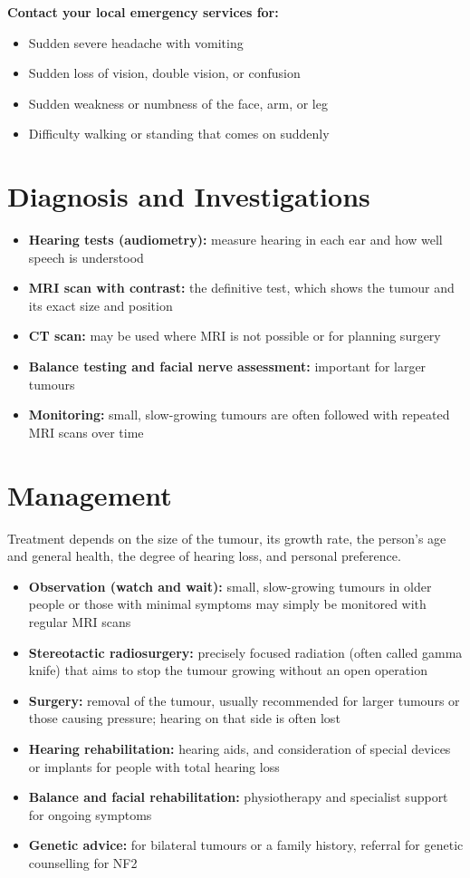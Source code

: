 \textbf{Contact your local emergency services for:}
\begin{itemize}
    \item Sudden severe headache with vomiting
    \item Sudden loss of vision, double vision, or confusion
    \item Sudden weakness or numbness of the face, arm, or leg
    \item Difficulty walking or standing that comes on suddenly
\end{itemize}

\section*{Diagnosis and Investigations}
\begin{itemize}
    \item \textbf{Hearing tests (audiometry):} measure hearing in each ear and how well speech is understood
    \item \textbf{MRI scan with contrast:} the definitive test, which shows the tumour and its exact size and position
    \item \textbf{CT scan:} may be used where MRI is not possible or for planning surgery
    \item \textbf{Balance testing and facial nerve assessment:} important for larger tumours
    \item \textbf{Monitoring:} small, slow-growing tumours are often followed with repeated MRI scans over time
\end{itemize}

\section*{Management}
Treatment depends on the size of the tumour, its growth rate, the person's age and general health, the degree of hearing loss, and personal preference.

\begin{itemize}
    \item \textbf{Observation (watch and wait):} small, slow-growing tumours in older people or those with minimal symptoms may simply be monitored with regular MRI scans
    \item \textbf{Stereotactic radiosurgery:} precisely focused radiation (often called gamma knife) that aims to stop the tumour growing without an open operation
    \item \textbf{Surgery:} removal of the tumour, usually recommended for larger tumours or those causing pressure; hearing on that side is often lost
    \item \textbf{Hearing rehabilitation:} hearing aids, and consideration of special devices or implants for people with total hearing loss
    \item \textbf{Balance and facial rehabilitation:} physiotherapy and specialist support for ongoing symptoms
    \item \textbf{Genetic advice:} for bilateral tumours or a family history, referral for genetic counselling for NF2
\end{itemize}

